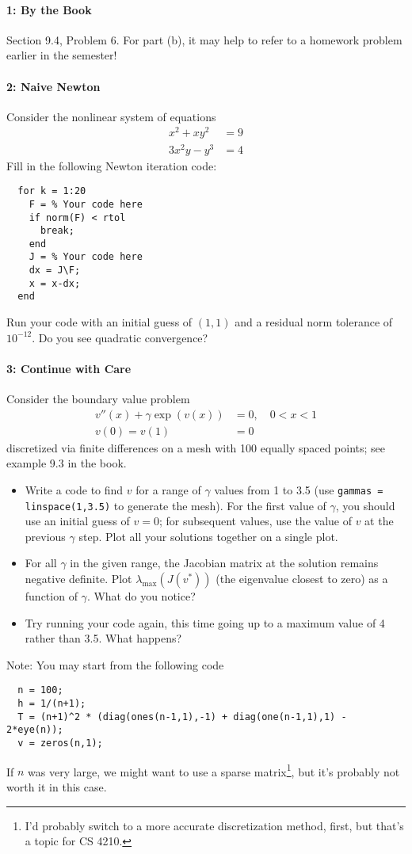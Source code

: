 \documentclass[12pt, leqno]{article}
\begin{document}

\paragraph*{1: By the Book}
Section 9.4, Problem 6.  For part (b), it may help to refer to
a homework problem earlier in the semester!

\paragraph*{2: Naive Newton}
Consider the nonlinear system of equations
\begin{align*}
  x^2 + xy^2 &= 9 \\
  3x^2y - y^3 &= 4
\end{align*}
Fill in the following Newton iteration code:
\begin{lstlisting}
  for k = 1:20
    F = % Your code here
    if norm(F) < rtol
      break;
    end
    J = % Your code here
    dx = J\F;
    x = x-dx;
  end
\end{lstlisting}
Run your code with an initial guess of $(1,1)$ and a residual norm
tolerance of $10^{-12}$.  Do you see quadratic convergence?

\paragraph*{3: Continue with Care}
Consider the boundary value problem
\begin{align*}
  v''(x) + \gamma \exp(v(x)) &= 0, \quad 0 < x < 1 \\
  v(0) = v(1) &= 0
\end{align*}
discretized via finite differences on a mesh with 100 equally spaced
points; see example 9.3 in the book.
\begin{itemize}
\item
  Write a code to find $v$ for
  a range of $\gamma$ values from 1 to 3.5 (use
  {\tt gammas = linspace(1,3.5)} to generate the mesh).  For the first
  value of $\gamma$, you should use an initial guess of $v = 0$;
  for subsequent values, use the value of $v$ at the previous
  $\gamma$ step.  Plot all your solutions together on a single plot.
\item
  For all $\gamma$ in the given range, the Jacobian matrix at the
  solution remains negative definite.  Plot
  $\lambda_{\max}(J(v^*))$ (the eigenvalue closest to zero) as a
  function of $\gamma$.  What do you notice?
\item
  Try running your code again, this time going up to a maximum value
  of 4 rather than 3.5.  What happens?
\end{itemize}
Note: You may start from the following code
\begin{lstlisting}
  n = 100;
  h = 1/(n+1);
  T = (n+1)^2 * (diag(ones(n-1,1),-1) + diag(one(n-1,1),1) - 2*eye(n));
  v = zeros(n,1);
\end{lstlisting}
If $n$ was very large, we might want to use a sparse matrix\footnote{%
I'd probably switch to a more accurate discretization method, first,
but that's a topic for CS 4210.
}, but it's probably not worth it in this case.
\end{document}

